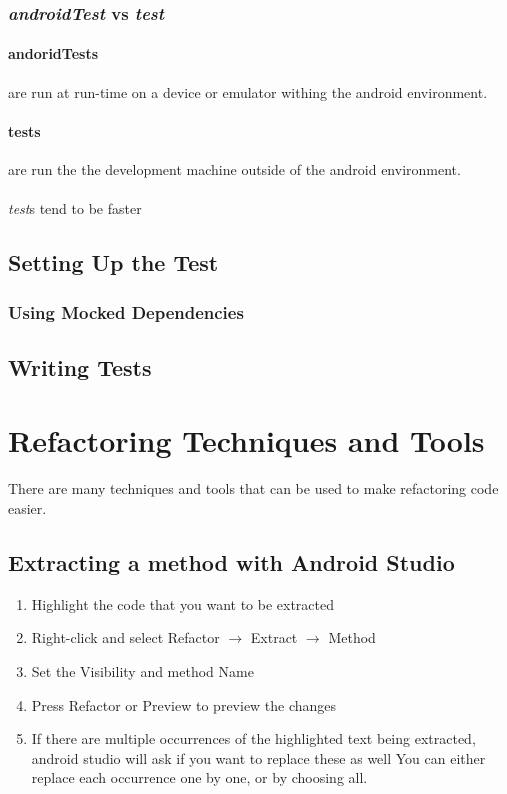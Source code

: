 \documentclass[]{article}
\begin{document}
\subsubsection{\textit{androidTest} vs \textit{test}}
\paragraph{andoridTests} are run at run-time on a device or emulator withing the android environment.
\paragraph{tests} are run the the development machine outside of the android environment.
\\\\
\textit{test}s tend to be faster

\subsection{Setting Up the Test}

\subsubsection{Using Mocked Dependencies}

\subsection{Writing Tests}

\section{Refactoring Techniques and Tools}
There are many techniques and tools that can be used to make refactoring code easier.
\subsection{Extracting a method with Android Studio}
\begin{enumerate}
	\item  Highlight the code that you want to be extracted
	\item Right-click and select Refactor $\rightarrow$ Extract $\rightarrow$ Method
	\item Set the Visibility and method Name 
	\item Press Refactor or Preview to preview the changes
	\item If there are multiple occurrences of the highlighted text being extracted, android studio will ask if you want to replace these as well 
	\subitem You can either replace each occurrence one by one, or by choosing all.
\end{enumerate}
\end{document}
